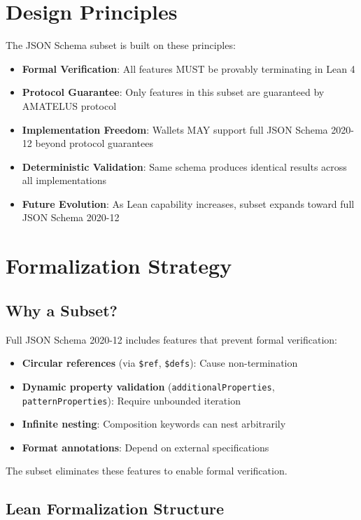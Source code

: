 \section{Design Principles}

The JSON Schema subset is built on these principles:

\begin{itemize}
  \item \textbf{Formal Verification}: All features MUST be provably terminating in Lean 4
  \item \textbf{Protocol Guarantee}: Only features in this subset are guaranteed by AMATELUS protocol
  \item \textbf{Implementation Freedom}: Wallets MAY support full JSON Schema 2020-12 beyond protocol guarantees
  \item \textbf{Deterministic Validation}: Same schema produces identical results across all implementations
  \item \textbf{Future Evolution}: As Lean capability increases, subset expands toward full JSON Schema 2020-12
\end{itemize}

\section{Formalization Strategy}

\subsection{Why a Subset?}

Full JSON Schema 2020-12 includes features that prevent formal verification:

\begin{itemize}
  \item \textbf{Circular references} (via \texttt{\$ref}, \texttt{\$defs}): Cause non-termination
  \item \textbf{Dynamic property validation} (\texttt{additionalProperties}, \texttt{patternProperties}): Require unbounded iteration
  \item \textbf{Infinite nesting}: Composition keywords can nest arbitrarily
  \item \textbf{Format annotations}: Depend on external specifications
\end{itemize}

The subset eliminates these features to enable formal verification.

\subsection{Lean Formalization Structure}


